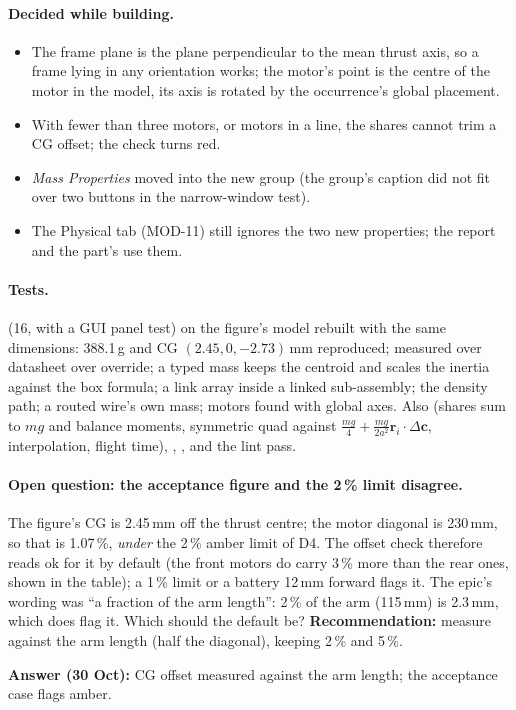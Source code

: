 \paragraph{Decided while building.}
\begin{itemize}[nosep]
  \item The frame plane is the plane perpendicular to the mean thrust axis, so a frame lying in any orientation works;
        the motor's point is the centre of the motor in the model, its axis is  rotated by the
        occurrence's global placement.
  \item With fewer than three motors, or motors in a line, the shares cannot trim a CG offset; the check turns red.
  \item \emph{Mass Properties} moved into the new group (the group's caption did not fit over two buttons in the
        narrow-window test).
  \item The Physical tab (MOD-11) still ignores the two new properties; the report and the part's  use them.
\end{itemize}

\paragraph{Tests.}  (16, with a GUI panel test) on the figure's model rebuilt with the same
dimensions: 388.1\,g and CG $(2.45, 0, -2.73)$\,mm reproduced; measured over datasheet over override; a typed mass
keeps the centroid and scales the inertia against the box formula; a link array inside a linked sub-assembly; the
density path; a routed wire's own mass; motors found with global axes. Also 
(shares sum to $mg$ and balance moments, symmetric quad against $\frac{mg}{4}+\frac{mg}{2a^2}\mathbf r_i\cdot\Delta\mathbf c$,
interpolation, flight time), , , 
and the lint  pass.

\paragraph{Open question: the acceptance figure and the 2\,\% limit disagree.} The figure's CG is 2.45\,mm off the
thrust centre; the motor diagonal is 230\,mm, so that is 1.07\,\%, \emph{under} the 2\,\% amber limit of D4. The
offset check therefore reads ok for it by default (the front motors do carry 3\,\% more than the rear ones, shown in
the table); a 1\,\% limit or a battery 12\,mm forward flags it. The epic's wording was ``a fraction of the arm
length'': 2\,\% of the arm (115\,mm) is 2.3\,mm, which does flag it. Which should the default be?
\textbf{Recommendation:} measure against the arm length (half the diagonal), keeping 2\,\% and 5\,\%.

\textbf{Answer (30 Oct):} CG offset measured against the arm length; the acceptance case flags amber.
